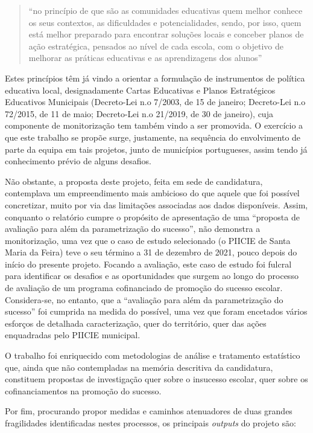 \documentclass[
]{book}
\begin{document}
\begin{quote}
``no princípio de que são as comunidades educativas quem melhor conhece os seus contextos, as dificuldades e potencialidades, sendo, por isso, quem está melhor preparado para encontrar soluções locais e conceber planos de ação estratégica, pensados ao nível de cada escola, com o objetivo de melhorar as práticas educativas e as aprendizagens dos alunos''
\end{quote}

Estes princípios têm já vindo a orientar a formulação de instrumentos de política educativa local, designadamente Cartas Educativas e Planos Estratégicos Educativos Municipais (Decreto-Lei n.o 7/2003, de 15 de janeiro; Decreto-Lei n.o 72/2015, de 11 de maio; Decreto-Lei n.o 21/2019, de 30 de janeiro), cuja componente de monitorização tem também vindo a ser promovida. O exercício a que este trabalho se propõe surge, justamente, na sequência do envolvimento de parte da equipa em tais projetos, junto de municípios portugueses, assim tendo já conhecimento prévio de alguns desafios.

Não obstante, a proposta deste projeto, feita em sede de candidatura, contemplava um empreendimento mais ambicioso do que aquele que foi possível concretizar, muito por via das limitações associadas aos dados disponíveis. Assim, conquanto o relatório cumpre o propósito de apresentação de uma ``proposta de avaliação para além da parametrização do sucesso'', não demonstra a monitorização, uma vez que o caso de estudo selecionado (o PIICIE de Santa Maria da Feira) teve o seu término a 31 de dezembro de 2021, pouco depois do início do presente projeto. Focando a avaliação, este caso de estudo foi fulcral para identificar os desafios e as oportunidades que surgem ao longo do processo de avaliação de um programa cofinanciado de promoção do sucesso escolar. Considera-se, no entanto, que a ``avaliação para além da parametrização do sucesso'' foi cumprida na medida do possível, uma vez que foram encetados vários esforços de detalhada caracterização, quer do território, quer das ações enquadradas pelo PIICIE municipal.

O trabalho foi enriquecido com metodologias de análise e tratamento estatístico que, ainda que não contempladas na memória descritiva da candidatura, constituem propostas de investigação quer sobre o insucesso escolar, quer sobre os cofinanciamentos na promoção do sucesso.

Por fim, procurando propor medidas e caminhos atenuadores de duas grandes fragilidades identificadas nestes processos, os principais \emph{outputs} do projeto são:
\end{document}
